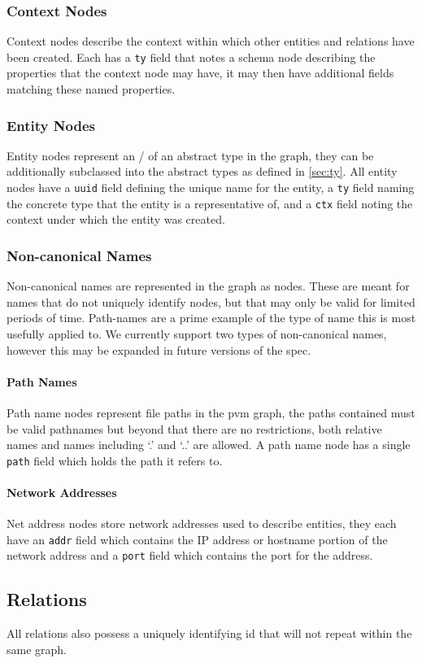 \documentclass[12pt,twoside,a4paper]{article}
\newcommand{\field}[1]{\texttt{#1}}
\newcommand{\para}[1]{\paragraph{#1\\}}
\begin{document}
\subsubsection{Context Nodes}
\label{sec:gs:node:context}
Context nodes describe the context within which other entities and relations have been created. Each has a \field{ty} field that notes a schema node describing the properties that the context node may have, it may then have additional fields matching these named properties.

\subsubsection{Entity Nodes}
\label{sec:gs:node:entity}
Entity nodes represent an \Entity/ of an abstract type in the graph, they can be additionally subclassed into the abstract types as defined in \autoref{sec:ty}. All entity nodes have a \field{uuid} field defining the unique name for the entity, a \field{ty} field naming the concrete type that the entity is a representative of, and a \field{ctx} field noting the context under which the entity was created.

\subsubsection{Non-canonical Names}
\label{sec:gs:node:name}
Non-canonical names are represented in the graph as nodes. These are meant for names that do not uniquely identify nodes, but that may only be valid for limited periods of time. Path-names are a prime example of the type of name this is most usefully applied to. We currently support two types of non-canonical names, however this may be expanded in future versions of the spec.

\para{Path Names}
\label{sec:gs:node:name:path}
Path name nodes represent file paths in the pvm graph, the paths contained must be valid pathnames but beyond that there are no restrictions, both relative names and names including `.' and `..' are allowed. A path name node has a single \field{path} field which holds the path it refers to.

\para{Network Addresses}
\label{sec:gs:node:name:net}
Net address nodes store network addresses used to describe entities, they each have an \field{addr} field which contains the IP address or hostname portion of the network address and a \field{port} field which contains the port for the address.

\subsection{Relations}
\label{sec:gs:rel}
All relations also possess a uniquely identifying id that will not repeat within the same graph.
\end{document}
